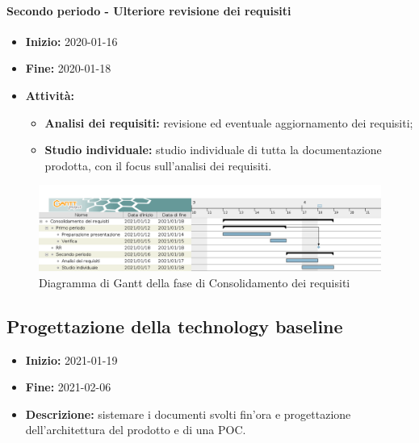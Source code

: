 \paragraph[Secondo periodo]{Secondo periodo - \textnormal{Ulteriore revisione dei requisiti}}
\begin{itemize}
    \item [] \textbf{Inizio:} 2020-01-16
    \item [] \textbf{Fine:} 2020-01-18
    \item [] \textbf{Attività:}
          \begin{itemize}
              \item \textbf{Analisi dei requisiti:} revisione ed eventuale aggiornamento dei requisiti;
              \item \textbf{Studio individuale:} studio individuale di tutta la documentazione prodotta, con il focus sull'analisi dei requisiti.
          \end{itemize}
\end{itemize}

\begin{figure}[H]
    \centering
    \includegraphics[width=1\linewidth]{res/images/pianificazione/consolidamento_dei_requisiti.png}
    \caption{Diagramma di Gantt della fase di Consolidamento dei requisiti}
    \label{fig:_Gantt consolidamento dei requisiti}
\end{figure}



\subsection{Progettazione della technology baseline} \label{_pianificazioneProgettazioneTechnologyBaseline}
\begin{itemize}
    \item []\textbf{Inizio:} 2021-01-19
    \item []\textbf{Fine:} 2021-02-06
    \item []\textbf{Descrizione:} sistemare i documenti svolti fin'ora e progettazione dell'architettura del prodotto e di una POC.
\end{itemize}

